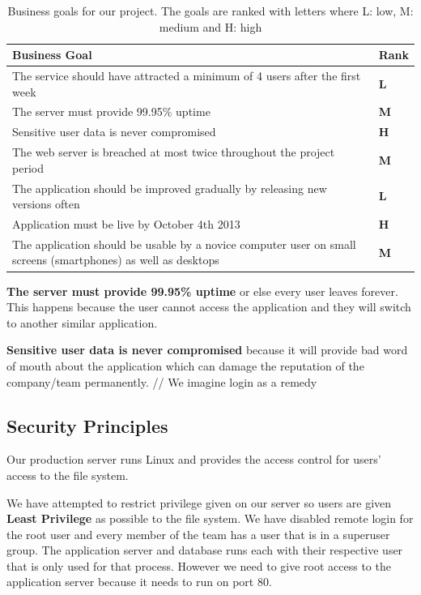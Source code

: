\documentclass[a4paper]{article}
\begin{document}
\begin{table}[h!]
	\begin{tabular}{|p{10cm}|l|}
		\hline
		\textbf{Business Goal} & \textbf{Rank} \\ \hline
The service should have attracted a minimum of 4 users after the first week & \textbf{L} \\ \hline
The server must provide 99.95\% uptime   & \textbf{M} \\ \hline
Sensitive user data is never compromised & \textbf{H} \\ \hline
The web server is breached at most twice throughout the project period &  \textbf{M} \\ \hline
The application should be improved gradually by releasing new versions often & \textbf{L} \\ \hline
Application must be live by October 4th 2013 &	\textbf{H}\\ \hline
The application should be usable by a novice computer user on small screens (smartphones) as well as desktops & \textbf{M}\\ \hline
	\end{tabular}
	\caption{Business goals for our project. The goals are ranked with letters where L: low, M: medium and H: high}
	\label{tab:business_goals}
\end{table}

\textbf{The server must provide 99.95\% uptime} or else every user leaves forever. This happens because the user cannot access the application and they will switch to another similar application.

\textbf{Sensitive user data is never compromised} because it will provide bad word of mouth about the application which can damage the reputation of the company/team permanently.
// We imagine login as a remedy

\subsection{Security Principles}

Our production server runs Linux and provides the access control for users' access to the file system.

We have attempted to restrict privilege given on our server so users are given 
\textbf{Least Privilege} as possible to the file system. We have disabled remote login for the root user and every member of the team has a user that is in a superuser group. The application server and database runs each with their respective user that is only used for that process. However we need to give root access to the application server because it needs to run on port 80.
\end{document}
